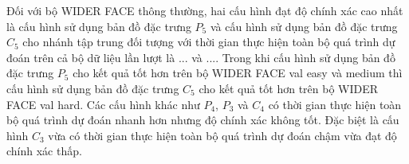 {    \noindent
    Đối với bộ WIDER FACE thông thường, hai cấu hình đạt độ chính xác cao nhất là cấu hình sử dụng bản đồ đặc trưng ${P}_{5}$ và cấu hình sử dụng bản đồ đặc trưng ${C}_{5}$ cho nhánh tập trung đối tượng với thời gian thực hiện toàn bộ quá trình dự đoán trên cả bộ dữ liệu lần lượt là ... và ....
    Trong khi cấu hình sử dụng bản đồ đặc trưng ${P}_{5}$ cho kết quả tốt hơn trên bộ WIDER FACE val easy và medium thì cấu hình sử dụng bản đồ đặc trưng ${C}_{5}$ cho kết quả tốt hơn trên bộ WIDER FACE val hard.
    Các cấu hình khác như ${P}_{4}$, ${P}_{3}$ và ${C}_{4}$ có thời gian thực hiện toàn bộ quá trình dự đoán nhanh hơn nhưng độ chính xác không tốt.
    Đặc biệt là cấu hình ${C}_{3}$ vừa có thời gian thực hiện toàn bộ quá trình dự đoán chậm vừa đạt độ chính xác thấp.

}
